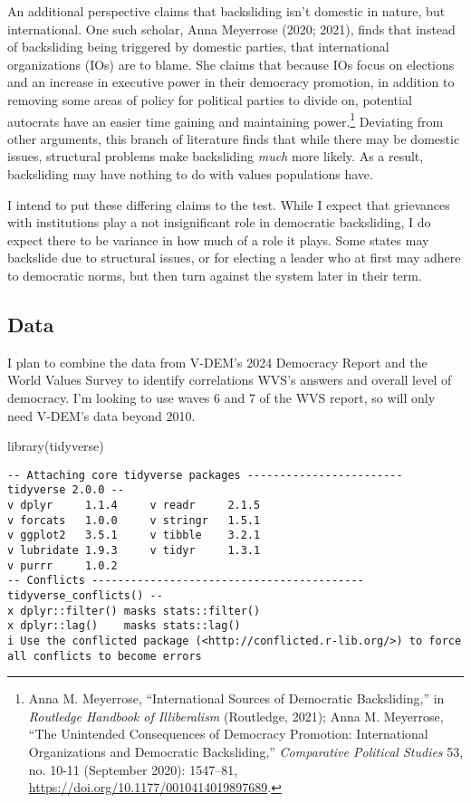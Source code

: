 \documentclass[
  letterpaper,
  DIV=11,
  numbers=noendperiod]{scrartcl}
\newenvironment{Shaded}{\begin{snugshade}}{\end{snugshade}}
\newcommand{\FunctionTok}[1]{\textcolor[rgb]{0.28,0.35,0.67}{#1}}
\newcommand{\NormalTok}[1]{\textcolor[rgb]{0.00,0.23,0.31}{#1}}
\begin{document}
An additional perspective claims that backsliding isn't domestic in
nature, but international. One such scholar, Anna Meyerrose (2020;
2021), finds that instead of backsliding being triggered by domestic
parties, that international organizations (IOs) are to blame. She claims
that because IOs focus on elections and an increase in executive power
in their democracy promotion, in addition to removing some areas of
policy for political parties to divide on, potential autocrats have an
easier time gaining and maintaining power.\footnote{Anna M. Meyerrose,
  {``International {Sources} of {Democratic Backsliding},''} in
  \emph{Routledge {Handbook} of {Illiberalism}} (Routledge, 2021); Anna
  M. Meyerrose, {``The {Unintended Consequences} of {Democracy
  Promotion}: {International Organizations} and {Democratic
  Backsliding},''} \emph{Comparative Political Studies} 53, no. 10-11
  (September 2020): 1547--81,
  \url{https://doi.org/10.1177/0010414019897689}.} Deviating from other
arguments, this branch of literature finds that while there may be
domestic issues, structural problems make backsliding \emph{much} more
likely. As a result, backsliding may have nothing to do with values
populations have.

I intend to put these differing claims to the test. While I expect that
grievances with institutions play a not insignificant role in democratic
backsliding, I do expect there to be variance in how much of a role it
plays. Some states may backslide due to structural issues, or for
electing a leader who at first may adhere to democratic norms, but then
turn against the system later in their term.

\subsection{Data}\label{data}

I plan to combine the data from V-DEM's 2024 Democracy Report and the
World Values Survey to identify correlations WVS's answers and overall
level of democracy. I'm looking to use waves 6 and 7 of the WVS report,
so will only need V-DEM's data beyond 2010.

\begin{Shaded}
\begin{Highlighting}[]
\FunctionTok{library}\NormalTok{(tidyverse)}
\end{Highlighting}
\end{Shaded}

\begin{verbatim}
-- Attaching core tidyverse packages ------------------------ tidyverse 2.0.0 --
v dplyr     1.1.4     v readr     2.1.5
v forcats   1.0.0     v stringr   1.5.1
v ggplot2   3.5.1     v tibble    3.2.1
v lubridate 1.9.3     v tidyr     1.3.1
v purrr     1.0.2     
-- Conflicts ------------------------------------------ tidyverse_conflicts() --
x dplyr::filter() masks stats::filter()
x dplyr::lag()    masks stats::lag()
i Use the conflicted package (<http://conflicted.r-lib.org/>) to force all conflicts to become errors
\end{verbatim}
\end{document}
